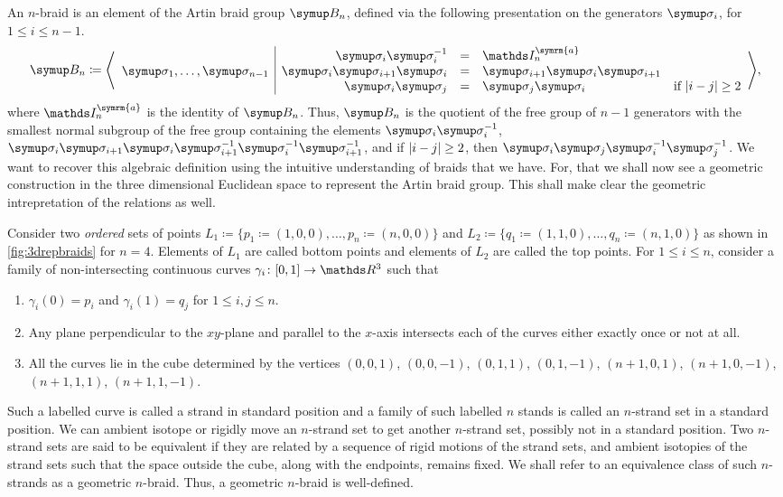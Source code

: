 An \(n\)-braid is an element of the Artin braid group \(\B_n\), defined via the following presentation on the generators \(\sigmaa_i\), for \(1 \leq i \leq n-1 \).
\[\B_n \coloneq\Biggl\langle
\begin{array}{c|rcll}
	& \sigmaa_i \sigmaa_i^{-1} &=& \symbb{I}_n^{\symrm{a}} &\\
	\sigmaa_1,\ldots, \sigmaa_{n-1} & \sigmaa_i \sigmaa_{i+1} \sigmaa_i &=& \sigmaa_{i+1} \sigmaa_i \sigmaa_{i+1} &\\
	& \sigmaa_i \sigmaa_j &=& \sigmaa_j \sigmaa_i &\text{if } \abs{i-j} \geq 2
\end{array}
\Biggr\rangle,\] where \(\symbb{I}_n^{\symrm{a}}\) is the identity of \(\B_n\).
Thus, \(\B_n\) is the quotient of the free group of \(n-1\) generators with the smallest normal subgroup of the free group containing the elements \(\sigmaa_i \sigmaa_i^{-1}\), \(\sigmaa_i \sigmaa_{i+1} \sigmaa_i \sigmaa_{i+1}^{-1} \sigmaa_i^{-1} \sigmaa_{i+1}^{-1}\), and if \(\lvert i-j\rvert \geq 2\), then \(\sigmaa_i \sigmaa_j \sigmaa_i^{-1} \sigmaa_{j}^{-1}\). We want to recover this algebraic definition using the intuitive understanding of braids that we have. For, that we shall now see a geometric construction in the three dimensional Euclidean space to represent the Artin braid group. This shall make clear the geometric intrepretation of the relations as well.

Consider two \textit{ordered} sets of points \(L_1 \coloneq \{p_1 \coloneq (1,0,0),\ldots, p_n \coloneq (n,0,0)\}\) and \(L_2 \coloneq \{q_1 \coloneq (1,1,0),\ldots, q_n \coloneq (n,1,0)\}\) as shown in \cref{fig:3drepbraids} for \(n=4\). Elements of \(L_1\) are called bottom points and elements of \(L_2\) are called the top points. For \(1 \leq i \leq n\), consider a family of non-intersecting continuous curves \(\gamma_i \colon [0, 1] \rightarrow \rthree\) such that
\begin{enumerate}
	\item \(\gamma_i (0) = p_i\) and \(\gamma_i (1) = q_j\) for \(1 \leq i, j \leq n\).
	\item Any plane perpendicular to the \(xy\)-plane and parallel to the \(x\)-axis intersects each of the curves either exactly once or not at all.
	\item All the curves lie in the cube determined by the vertices \((0,0,1)\), \((0,0,-1)\), \((0,1,1)\), \((0,1,-1)\), \((n+1,0,1)\), \((n+1,0,-1)\), \((n+1,1,1)\), \((n+1,1,-1)\).
\end{enumerate}
Such a labelled curve is called a strand in standard position and a family of such labelled \(n\) stands is called an \(n\)-strand set in a standard position. We can ambient isotope or rigidly move an \(n\)-strand set to get another \(n\)-strand set, possibly not in a standard position. Two \(n\)-strand sets are said to be equivalent if they are related by a sequence of rigid motions of the strand sets, and ambient isotopies of the strand sets such that the space outside the cube, along with the endpoints, remains fixed. We shall refer to an equivalence class of such \(n\)-strands as a geometric \(n\)-braid. Thus, a geometric \(n\)-braid is well-defined.

